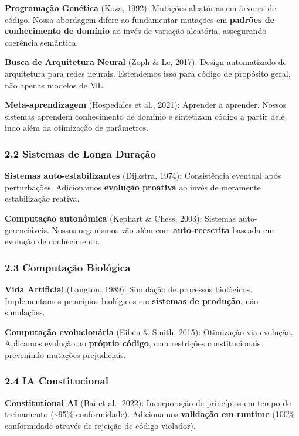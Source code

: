 \documentclass[
]{article}
\begin{document}
\textbf{Programação Genética} (Koza, 1992): Mutações aleatórias em
árvores de código. Nossa abordagem difere ao fundamentar mutações em
\textbf{padrões de conhecimento de domínio} ao invés de variação
aleatória, assegurando coerência semântica.

\textbf{Busca de Arquitetura Neural} (Zoph \& Le, 2017): Design
automatizado de arquitetura para redes neurais. Estendemos isso para
código de propósito geral, não apenas modelos de ML.

\textbf{Meta-aprendizagem} (Hospedales et al., 2021): Aprender a
aprender. Nossos sistemas aprendem conhecimento de domínio e sintetizam
código a partir dele, indo além da otimização de parâmetros.

\subsubsection{2.2 Sistemas de Longa
Duração}\label{sistemas-de-longa-durauxe7uxe3o}

\textbf{Sistemas auto-estabilizantes} (Dijkstra, 1974): Consistência
eventual após perturbações. Adicionamos \textbf{evolução proativa} ao
invés de meramente estabilização reativa.

\textbf{Computação autonômica} (Kephart \& Chess, 2003): Sistemas
auto-gerenciáveis. Nossos organismos vão além com
\textbf{auto-reescrita} baseada em evolução de conhecimento.

\subsubsection{2.3 Computação
Biológica}\label{computauxe7uxe3o-bioluxf3gica}

\textbf{Vida Artificial} (Langton, 1989): Simulação de processos
biológicos. Implementamos princípios biológicos em \textbf{sistemas de
produção}, não simulações.

\textbf{Computação evolucionária} (Eiben \& Smith, 2015): Otimização via
evolução. Aplicamos evolução ao \textbf{próprio código}, com restrições
constitucionais prevenindo mutações prejudiciais.

\subsubsection{2.4 IA Constitucional}\label{ia-constitucional}

\textbf{Constitutional AI} (Bai et al., 2022): Incorporação de
princípios em tempo de treinamento (\textasciitilde95\% conformidade).
Adicionamos \textbf{validação em runtime} (100\% conformidade através de
rejeição de código violador).
\end{document}

